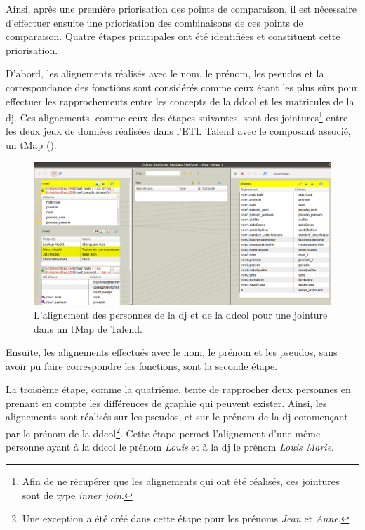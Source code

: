 Ainsi, après une première priorisation des points de comparaison, il est nécessaire d'effectuer ensuite une priorisation des combinaisons de ces points de comparaison. Quatre étapes principales ont été identifiées et constituent cette priorisation.

\noindent D'abord, les alignements réalisés avec le nom, le prénom, les pseudos et la correspondance des fonctions sont considérés comme ceux étant les plus sûrs pour effectuer les rapprochements entre les concepts de la \ac{ddcol} et les matricules de la \ac{dj}. Ces alignements, comme ceux des étapes suivantes, sont des jointures\footnote{Afin de ne récupérer que les alignements qui ont été réalisés, ces jointures sont de type \textit{inner join}.} entre les deux jeux de données réalisées dans l'ETL Talend avec le composant associé, un tMap ().
\begin{figure}[!h]
	\centering
	\includegraphics[width=16cm]{images/tmpa_jointure1_dj.png}
	\caption{L'alignement des personnes de la \ac{dj} et de la \ac{ddcol} pour une jointure dans un tMap de Talend.}
	\label{tmap_jointures}
\end{figure}

\noindent Ensuite, les alignements effectués avec le nom, le prénom et les pseudos, sans avoir pu faire correspondre les fonctions, sont la seconde étape.

\noindent La troisième étape, comme la quatrième, tente de rapprocher deux personnes en prenant en compte les différences de graphie qui peuvent exister. Ainsi, les alignements sont réalisés sur les pseudos, et sur le prénom de la \ac{dj} commençant par le prénom de la \ac{ddcol}\footnote{Une exception a été créé dans cette étape pour les prénoms \textit{Jean} et \textit{Anne}.}. Cette étape permet l'alignement d'une même personne ayant à la \ac{ddcol} le prénom \textit{Louis} et à la \ac{dj} le prénom \textit{Louis Marie}.

